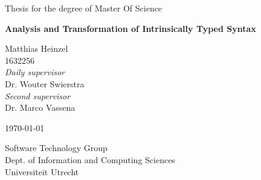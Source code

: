 \begin{titlepage}
  \begin{center}
    \vspace*{1cm}

    \large
    Thesis for the degree of Master Of Science

    \vspace{0.4cm}

    \Huge \textbf{Analysis and Transformation of Intrinsically Typed Syntax}
    \date{\today}

    \vspace{1.6cm}

    \large
    Matthias Heinzel\\
    1632256\\
    \vspace{0.8cm}
    \textit{Daily supervisor}\\
    Dr. Wouter Swierstra\\
    \vspace{0.4cm}
    \textit{Second supervisor}\\
    Dr. Marco Vassena\\

    \vfill

    \today

    \vspace{0.8cm}

    Software Technology Group\\
    Dept. of Information and Computing Sciences\\
    Universiteit Utrecht

  \end{center}
\end{titlepage}
